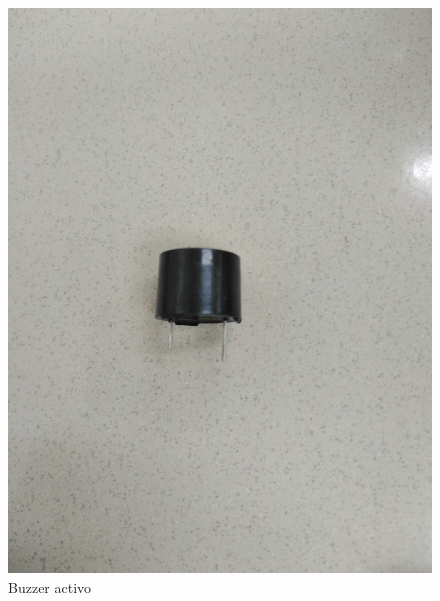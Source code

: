 \begin{figure}[H]
  \centering
  \includegraphics[scale = 0.1]{Imagenes/materiales/buzzer_activo.jpg}
  \caption{Buzzer activo}
\end{figure}